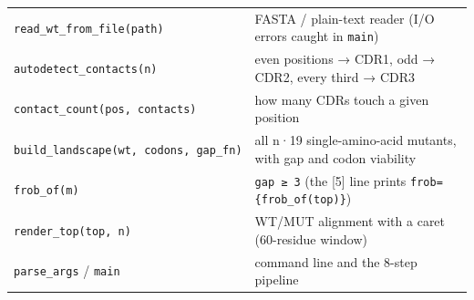 \documentclass[12pt,a4paper]{article}
\begin{document}
\begin{longtable}[]{@{}ll@{}}
\begin{minipage}[t]{0.47\columnwidth}\raggedright
\texttt{read\_wt\_from\_file(path)}\strut
\end{minipage} & \begin{minipage}[t]{0.47\columnwidth}\raggedright
FASTA / plain-text reader (I/O errors caught in \texttt{main})\strut
\end{minipage}\tabularnewline
\begin{minipage}[t]{0.47\columnwidth}\raggedright
\texttt{autodetect\_contacts(n)}\strut
\end{minipage} & \begin{minipage}[t]{0.47\columnwidth}\raggedright
even positions → CDR1, odd → CDR2, every third → CDR3\strut
\end{minipage}\tabularnewline
\begin{minipage}[t]{0.47\columnwidth}\raggedright
\texttt{contact\_count(pos,\ contacts)}\strut
\end{minipage} & \begin{minipage}[t]{0.47\columnwidth}\raggedright
how many CDRs touch a given position\strut
\end{minipage}\tabularnewline
\begin{minipage}[t]{0.47\columnwidth}\raggedright
\texttt{build\_landscape(wt,\ codons,\ gap\_fn)}\strut
\end{minipage} & \begin{minipage}[t]{0.47\columnwidth}\raggedright
all n·19 single-amino-acid mutants, with gap and codon viability\strut
\end{minipage}\tabularnewline
\begin{minipage}[t]{0.47\columnwidth}\raggedright
\texttt{frob\_of(m)}\strut
\end{minipage} & \begin{minipage}[t]{0.47\columnwidth}\raggedright
\texttt{gap\ ≥\ 3} (the {[}5{]} line prints
\texttt{frob=\{frob\_of(top)\}})\strut
\end{minipage}\tabularnewline
\begin{minipage}[t]{0.47\columnwidth}\raggedright
\texttt{render\_top(top,\ n)}\strut
\end{minipage} & \begin{minipage}[t]{0.47\columnwidth}\raggedright
WT/MUT alignment with a caret (60-residue window)\strut
\end{minipage}\tabularnewline
\begin{minipage}[t]{0.47\columnwidth}\raggedright
\texttt{parse\_args} / \texttt{main}\strut
\end{minipage} & \begin{minipage}[t]{0.47\columnwidth}\raggedright
command line and the 8-step pipeline\strut
\end{minipage}\tabularnewline
\bottomrule
\end{longtable}
\end{document}

